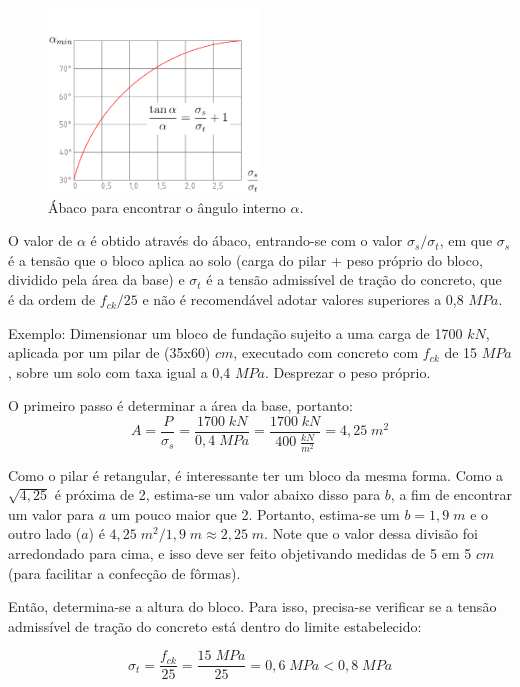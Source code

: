 \begin{figure}[htb]
	\begin{center}
	\caption{Ábaco para encontrar o ângulo interno $\alpha$.}
    	\includegraphics[width=0.5\textwidth]{Fundacoes-rasas-ou-diretas/Imagens/Abaco-bloco-de-fundacao.png}
	\end{center}
\end{figure}

O valor de $\alpha$ é obtido através do ábaco, entrando-se com o valor $\sigma_s/\sigma_t$, em que $\sigma_s$ é a tensão que o bloco aplica ao solo (carga do pilar + peso próprio do bloco, dividido pela área da base) e $\sigma_t$ é a tensão admissível de tração do concreto, que é da ordem de $f_{ck}/25$ e não é recomendável adotar valores superiores a 0,8 $MPa$.

Exemplo: Dimensionar um bloco de fundação sujeito a uma carga de 1700 $kN$, aplicada por um pilar de (35x60) $cm$, executado com concreto com $f_{ck}$ de 15 $MPa$, sobre um solo com taxa igual a 0,4 $MPa$. Desprezar o peso próprio.

O primeiro passo é determinar a área da base, portanto: $$A=\frac{P}{\sigma_s}=\frac{1700\;kN}{0,4\;MPa}=\frac{1700\;kN}{400\;\frac{kN}{m^2}}=4,25\;m^2$$

Como o pilar é retangular, é interessante ter um bloco da mesma forma. Como a $\sqrt{4,25}$ é próxima de 2, estima-se um valor abaixo disso para $b$, a fim de encontrar um valor para $a$ um pouco maior que 2. Portanto, estima-se um $b=1,9\;m$ e o outro lado ($a$) é $4,25\;m^2/1,9\;m\approx 2,25\;m$. Note que o valor dessa divisão foi arredondado para cima, e isso deve ser feito objetivando medidas de 5 em 5 $cm$ (para facilitar a confecção de fôrmas).

Então, determina-se a altura do bloco. Para isso, precisa-se verificar se a tensão admissível de tração do concreto está dentro do limite estabelecido:

$$\sigma_t=\frac{f_{ck}}{25}=\frac{15\;MPa}{25}=0,6\;MPa < 0,8\;MPa$$

